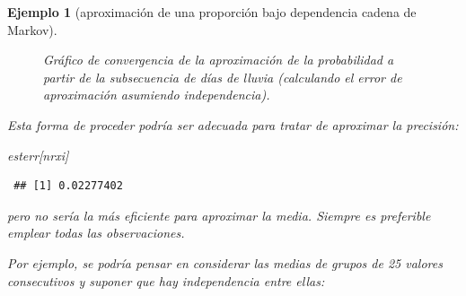 \documentclass[
]{book}
\newenvironment{Shaded}{\begin{snugshade}}{\end{snugshade}}
\newcommand{\NormalTok}[1]{#1}
\theoremstyle{break}
\newtheorem{example}{Ejemplo}[chapter]
\theoremstyle{nonumberplain}
\begin{document}
\begin{example}[aproximación de una proporción bajo dependencia cadena de Markov]
\begin{figure}[!htb]
\caption{Gráfico de convergencia de la aproximación de la probabilidad a partir de la subsecuencia de días de lluvia (calculando el error de aproximación asumiendo independencia).}\label{fig:conv-dep2}
\end{figure}

Esta forma de proceder podría ser adecuada para tratar de aproximar la precisión:

\begin{Shaded}
\begin{Highlighting}[]
\NormalTok{esterr[nrxi]}
\end{Highlighting}
\end{Shaded}

\begin{verbatim}
 ## [1] 0.02277402
\end{verbatim}

pero no sería la más eficiente para aproximar la media. Siempre es preferible emplear todas las observaciones.

Por ejemplo, se podría pensar en considerar las medias de grupos de 25 valores consecutivos y suponer que hay independencia entre ellas:


\end{example}
\end{document}
